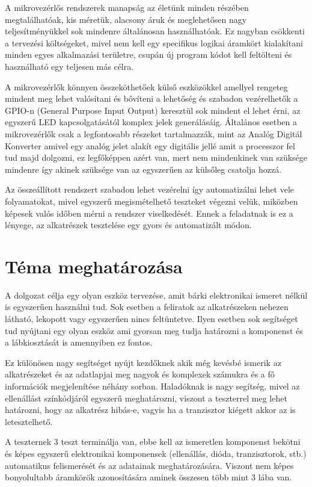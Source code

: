 A mikrovezérlős rendszerek manapság az életünk minden részében megtalálhatóak, kis méretük,
alacsony áruk és meglehetősen nagy teljesítményükkel sok mindenre általánosan használhatóak.
Ez nagyban csökkenti a tervezési költségeket, mivel nem kell egy specifikus logikai áramkört
kialakítani minden egyes alkalmazási területre, csupán új program kódot kell feltölteni és
használható egy teljesen más célra.

A mikrovezérlők könnyen összeköthetőek külső eszközökkel amellyel rengeteg mindent meg lehet
valósítani és bővíteni a lehetőség és szabadon vezérelhetők a GPIO-n (General Purpose Input
Output) keresztül sok mindent el lehet érni, az egyszerű LED kapcsolgatásától komplex jelek
generálásáig. Általános esetben a mikrovezérlők csak a legfontosabb részeket tartalmazzák,
mint az Analóg Digitál Konverter amivel egy analóg jelet alakít egy digitális jellé amit a
processzor fel tud majd dolgozni, ez legfőképpen azért van, mert nem mindenkinek van szüksége
mindenre így akinek szüksége van az egyszerűen az külsőleg csatolja hozzá.

Az összeállított rendszert szabadon lehet vezérelni így automatizálni lehet vele folyamatokat,
mivel egyszerű megismételhető teszteket végezni velük, miközben képesek valós időben mérni
a rendszer viselkedését. Ennek a feladatnak is ez a lényege, az alkatrészek tesztelése egy
gyors és automatizált módon.


\section{Téma meghatározása}

A dolgozat célja egy olyan eszköz tervezése, amit bárki elektronikai ismeret nélkül is egyszerűen 
használni tud. Sok esetben a feliratok az alkatrészeken nehezen látható, lekopott vagy 
egyszerűen nincs feltüntetve. Ilyen esetben sok segítséget tud nyújtani egy olyan eszköz ami 
gyorsan meg tudja határozni a komponenst és a lábkiosztását is amennyiben ez fontos.

Ez különösen nagy segítséget nyújt kezdőknek akik még kevésbé ismerik az alkatrészeket és az 
adatlapjai meg nagyok és komplexek számukra és a fő információk megjelenítése néhány sorban. 
Haladóknak is nagy segítség, mivel az ellenállást színkódjáról egyszerű meghatározni, viszont 
a teszterrel meg lehet határozni, hogy az alkatrész hibás-e, vagyis ha a tranzisztor kiégett 
akkor az is letesztelhető.

A teszternek 3 teszt terminálja van, ebbe kell az ismeretlen komponenst bekötni és képes 
egyszerű elektronikai komponensek (ellenállás, dióda, tranzisztorok, stb.) automatikus 
felismerését és az adatainak meghatározására. Viszont nem képes bonyolultabb áramkörök 
azonosítására aminek összesen több mint 3 lába van.

